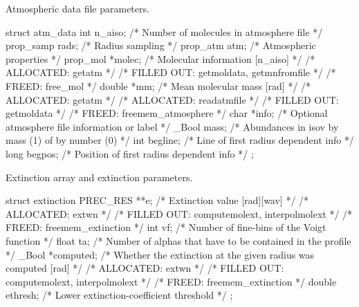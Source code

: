 \documentclass[letterpaper,12pt]{article}
\begin{document}
\noindent \newline
Atmospheric data file parameters.
\begin{plain}
struct atm_data{
  int n_aiso;            /* Number of molecules in atmosphere file          */
  prop_samp rads;        /* Radius sampling                                 */
  prop_atm atm;          /* Atmospheric properties                          */
  prop_mol *molec;       /* Molecular information [n_aiso]                  */
    /* ALLOCATED:	getatm						    */
    /* FILLED OUT:	getmoldata, getmnfromfile			    */
    /* FREED: 		free_mol					    */ 
  double *mm;            /* Mean molecular mass [rad]                       */
    /* ALLOCATED:	getatm						    */
    /* ALLOCATED:       readatmfile                                         */
    /* FILLED OUT:	getmoldata					    */
    /* FREED: 		freemem_atmosphere				    */ 
  char *info;            /* Optional atmosphere file information or label   */
  _Bool mass;            /* Abundances in isov by mass (1) of by number (0) */
  int begline;           /* Line of first radius dependent info             */
  long begpos;           /* Position of first radius dependent info         */
};
\end{plain}

\noindent \newline
Extinction array and extinction parameters.
\begin{plain}
struct extinction{
  PREC_RES **e;      /* Extinction value [rad][wav]                         */
    /* ALLOCATED:	extwn						    */
    /* FILLED OUT:      computemolext, interpolmolext			    */
    /* FREED: 		freemem_extinction				    */ 
  int vf;            /* Number of fine-bins of the Voigt function           */
  float ta;          /* Number of alphas that have to be contained in
                        the profile                                         */
  _Bool *computed;   /* Whether the extinction at the given radius was
                        computed [rad]                                      */
    /* ALLOCATED:	extwn						    */
    /* FILLED OUT:      computemolext, interpolmolext			    */
    /* FREED: 		freemem_extinction				    */
  double ethresh;    /* Lower extinction-coefficient threshold              */
};
\end{plain}
\end{document}
